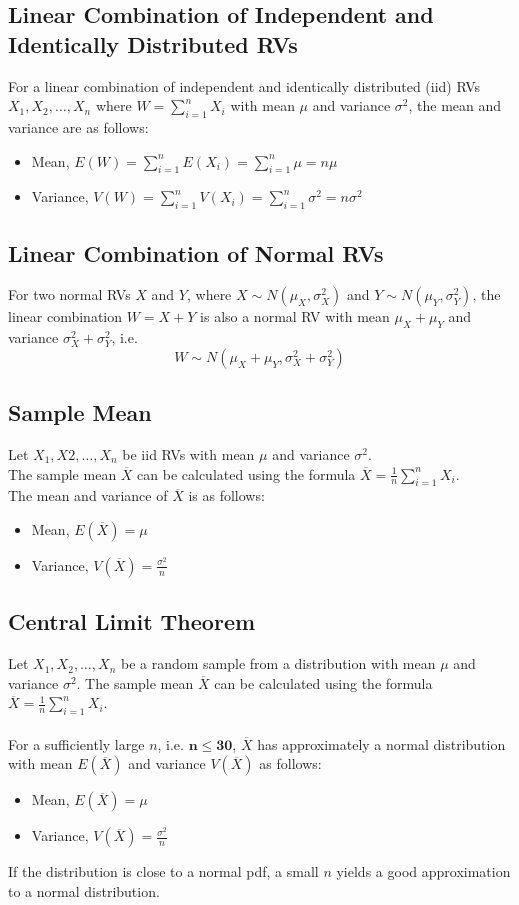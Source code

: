 \documentclass[a4paper]{article}
\begin{document}
\subsection{Linear Combination of Independent and Identically Distributed RVs}
For a linear combination of independent and identically distributed (iid) RVs $X_{1}, X_{2}, \ldots, X_{n}$ where $\displaystyle W = \sum_{i=1}^{n}X_{i}$ with mean $\mu$ and variance $\sigma^2$, the mean and variance are as follows:
\begin{itemize}
    \item Mean, $\displaystyle E(W) = \sum_{i=1}^{n}E(X_{i}) = \sum_{i=1}^{n}\mu = n\mu$
    \item Variance, $\displaystyle V(W) = \sum_{i=1}^{n}V(X_{i}) = \sum_{i=1}^{n}\sigma^2 = n\sigma^2$
\end{itemize}
\subsection{Linear Combination of Normal RVs}
For two normal RVs $X$ and $Y$, where $X\sim N(\mu_{X},\sigma^{2}_{X})$ and $Y\sim N(\mu_{Y}, \sigma^2_{Y})$, the linear combination $W = X + Y$ is also a normal RV with mean $\mu_{X} + \mu_{Y}$ and variance $\sigma^2_{X} + \sigma^2_{Y}$, i.e.
$$W\sim N(\mu_{X}+\mu_{Y}, \sigma^{2}_{X}+\sigma^{2}_{Y})$$
\subsection{Sample Mean}
Let $X_{1}, X{2}, \ldots, X_{n}$ be iid RVs with mean $\mu$ and variance $\sigma^2$. \\ The sample mean $\overline{X}$ can be calculated using the formula $\displaystyle \overline{X} = \frac{1}{n}\sum_{i=1}^{n}X_{i}$.\\
The mean and variance of $\overline{X}$ is as follows:
\begin{itemize}
    \item Mean, $E(\overline{X}) = \mu$
    \item Variance, $\displaystyle V(\overline{X}) = \frac{\sigma^2}{n}$
\end{itemize}
\newpage
\subsection{Central Limit Theorem}
Let $X_{1}, X_{2}, \ldots, X_{n}$ be a random sample from a distribution with mean $\mu$ and variance $\sigma^2$. The sample mean $\overline{X}$ can be calculated using the formula $\displaystyle \overline{X} = \frac{1}{n}\sum_{i=1}^{n}X_{i}$.\\
\\
For a sufficiently large $n$, i.e. $\mathbf{n \leq 30}$, $\overline{X}$ has approximately a normal distribution with mean $E(\overline{X})$ and variance $V(\overline{X})$ as follows:
\begin{itemize}
    \item Mean, $E(\overline{X}) = \mu$
    \item Variance, $\displaystyle V(\overline{X}) = \frac{\sigma^2}{n}$
\end{itemize}
\noindent If the distribution is close to a normal pdf, a small $n$ yields a good approximation to a normal distribution.
\end{document}
